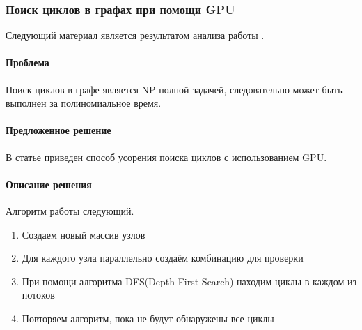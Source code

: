 \subsubsection{Поиск циклов в графах при помощи GPU}
Следующий материал является результатом анализа работы \cite{Mahdi2011}.

\paragraph{Проблема}
Поиск циклов в графе является NP-полной задачей, следовательно может быть выполнен за полиномиальное время.

\paragraph{Предложенное решение}
В статье приведен способ усорения поиска циклов с использованием GPU.

\paragraph{Описание решения}
Алгоритм работы следующий.
\begin{enumerate}
    \item Создаем новый массив узлов
    \item Для каждого узла параллельно создаём комбинацию для проверки
    \item При помощи алгоритма DFS(Depth First Search) находим циклы в каждом из потоков
    \item Повторяем алгоритм, пока не будут обнаружены все циклы
\end{enumerate}
\noteattributes{}
